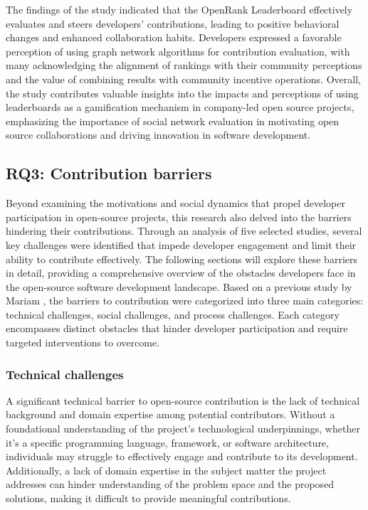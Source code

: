 The findings of the study indicated that the OpenRank Leaderboard effectively evaluates and steers developers' contributions, leading to positive behavioral changes and enhanced collaboration habits. Developers expressed a favorable perception of using graph network algorithms for contribution evaluation, with many acknowledging the alignment of rankings with their community perceptions and the value of combining results with community incentive operations. Overall, the study contributes valuable insights into the impacts and perceptions of using leaderboards as a gamification mechanism in company-led open source projects, emphasizing the importance of social network evaluation in motivating open source collaborations and driving innovation in software development.


\subsection{RQ3: Contribution barriers}

Beyond examining the motivations and social dynamics that propel developer participation in open-source projects, this research also delved into the barriers hindering their contributions. Through an analysis of five selected studies, several key challenges were identified that impede developer engagement and limit their ability to contribute effectively. The following sections will explore these barriers in detail, providing a comprehensive overview of the obstacles developers face in the open-source software development landscape. Based on a previous study by Mariam \cite{04guizani2021long}, the barriers to contribution were categorized into three main categories: technical challenges, social challenges, and process challenges. Each category encompasses distinct obstacles that hinder developer participation and require targeted interventions to overcome.


\subsubsection{Technical challenges}

A significant technical barrier to open-source contribution is the lack of technical background and domain expertise among potential contributors. Without a foundational understanding of the project's technological underpinnings, whether it's a specific programming language, framework, or software architecture, individuals may struggle to effectively engage and contribute to its development. Additionally, a lack of domain expertise in the subject matter the project addresses can hinder understanding of the problem space and the proposed solutions, making it difficult to provide meaningful contributions.

